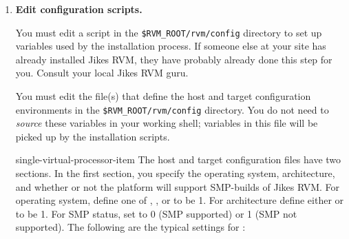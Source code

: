 \begin{enumerate}
\begin{verbatim}
setenv RVM_ROOT $HOME/rvmRoot       # <--define your working directory 
setenv RVM_BUILD $HOME/rvmBuild     # <--define your current build directory 
setenv PATH $RVM_ROOT/rvm/bin:$PATH
setenv RVM_HOST_CONFIG $RVM_ROOT/rvm/config/powerpc-ibm-aix4.3.3.0
setenv RVM_TARGET_CONFIG $RVM_ROOT/rvm/config/powerpc-ibm-aix4.3.3.0
\end{verbatim}

{\em Note:} You should define each of these environment variables as an
{\em absolute} path.  The builder template expansion process will crash
and burn if you use a \texttt{..} in these paths.

For a Linux\Rweb{}-Intel\Rweb{} environment, the exports
would be replaced with the following:

\begin{verbatim}
setenv RVM_HOST_CONFIG $RVM_ROOT/rvm/config/i686-pc-linux-gnu
setenv RVM_TARGET_CONFIG $RVM_ROOT/rvm/config/i686-pc-linux-gnu
\end{verbatim}

These two variables point to the same file when the type of system  
doing the build is the same as where you are going 
the execute Jikes\TMweb{} RVM.\@  To cross build a system
({\it e.g.}, to build on Linux/x86 for an AIX\TMweb{}/PowerPC\TMweb{}
platform), see [
  (sub-section~\Ref, page~\Pageref)]{cross-platform-building}.

\item {\bf Edit configuration scripts.}

You must edit a script in the \texttt{\$RVM\_\-ROOT/rvm/config}
directory to set  
up variables used by the installation process.  
If someone else at your site has already installed Jikes RVM, they have
probably already done this step for you.  Consult your local Jikes RVM guru.

You must edit the file(s) that define the host and target configuration
environments in the \texttt{\$RVM\_\-ROOT/rvm/config} directory.  
You do not need to {\em source} these variables in your working shell; 
variables in this file will be picked up by the installation scripts.  

\begin{Label}{single-virtual-processor-item}
The host and target configuration files have two sections.  In the
first section, you specify the operating system, architecture, and
whether or not the platform will support SMP-builds of Jikes RVM.\@ 
For operating system, define one of , 
,
or  
to be 1.  For architecture define either
 or  to be 1.  For SMP status, set
 to 0 (SMP supported) or 1 (SMP not
supported).  The following are the typical settings for
:


\end{Label}
\end{enumerate}
